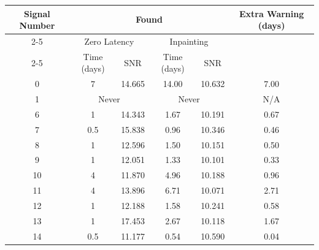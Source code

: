\begin{tabular}{|c|cc|cc|c|}
\hline
\multirow{3}{*}{Signal Number} & \multicolumn{4}{c|}{Found} & \multirow{3}{*}{Extra Warning (days)} \\
\cline{2-5}
& \multicolumn{2}{c|}{Zero Latency} & \multicolumn{2}{c|}{Inpainting} & \\
\cline{2-5}
 & Time (days)  & SNR & Time (days)  & SNR & \\
\hline
0 & 7 &   14.665 & 14.00 &  10.632 & 7.00 \\
1 & \multicolumn{2}{c|}{Never}    & \multicolumn{2}{c|}{Never}   & N/A \\
6 & 1 &   14.343 & 1.67 &  10.191 & 0.67 \\
7 & 0.5 &   15.838 & 0.96 &  10.346 & 0.46 \\
8 & 1 &   12.596 & 1.50 &  10.151 & 0.50 \\
9 & 1 &   12.051 & 1.33 &  10.101 & 0.33 \\
10 & 4 &   11.870 & 4.96 &  10.188 & 0.96 \\
11 & 4 &   13.896 & 6.71 &  10.071 & 2.71 \\
12 & 1 &   12.188 & 1.58 &  10.241 & 0.58 \\
13 & 1 &   17.453 & 2.67 &  10.118 & 1.67 \\
14 & 0.5 &   11.177 & 0.54 &  10.590 & 0.04 \\
\hline
\end{tabular}